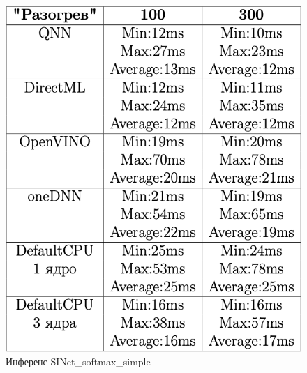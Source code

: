\documentclass[a4paper,14pt]{extreport}
\begin{document}
        \begin{figure}[!h]
            \begin{center}
                \begin{minipage}[h]{0.4\linewidth}
                    \includegraphics[width=1\linewidth]{images-results/sinet.png}
                    \caption{Инференс SINet\_softmax\_simple}
                    \label{ris:sinet}
                \end{minipage}
                \hfill
                \begin{minipage}[h]{0.4\linewidth}

\end{minipage}
\end{center}
\end{figure}
\end{document}
